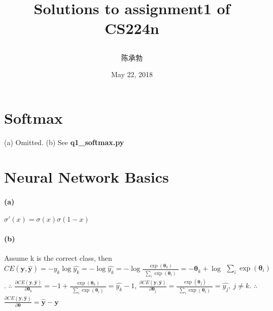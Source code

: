 \documentclass{article}
\title{
	\begin{LARGE}
		\textbf{Solutions to assignment1 of CS224n}
	\end{LARGE}
	}
\author{陈承勃}
\date{May 22, 2018}
\begin{document}
\begin{CJK}{UTF8}{gbsn}
\maketitle
\end{CJK}
\begin{spacing}{1.5} %

\section{Softmax}
(a) Omitted. 
(b) See \textbf{q1\_softmax.py}

\section{Neural Network Basics}
\paragraph{(a)} $ \sigma'(x)=\sigma(x)\sigma(1-x) $
\paragraph{(b)} 
Assume k is the correct class, then \newline
$ CE(\boldsymbol{y},\boldsymbol{\widehat{y}})=
-y_{k}\log \widehat{y_{k}}=-\log \widehat{y_{k}}
=-\log \frac{\exp(\boldsymbol{\theta}_k)}{\begin{matrix} \sum_{i} \exp(\boldsymbol{\theta}_i) \end{matrix}}
=-\boldsymbol{\theta}_{k}+\log \begin{matrix} \sum_{i} \exp(\boldsymbol{\theta}_{i}) \end{matrix} $.
\newline
$ \boldsymbol{\therefore} $
$ \frac{\partial CE(\boldsymbol{y},\boldsymbol{\widehat{y}})}{\partial \boldsymbol{\theta}_{k}}
=-1+\frac{\exp(\boldsymbol{\theta}_k)}{\begin{matrix} \sum_{i} \exp(\boldsymbol{\theta}_{i}) \end{matrix}}
=\widehat{y_{k}}-1 $, 
\newline
$ \frac{\partial CE(\boldsymbol{y},\boldsymbol{\widehat{y}})}{\partial \boldsymbol{\theta}_{j}}
=\frac{\exp(\boldsymbol{\theta}_j)}{\begin{matrix} \sum_{i} \exp(\boldsymbol{\theta}_{i}) \end{matrix}}
=\widehat{y_{j}},\ j\neq k $.
\newline
$ \boldsymbol{\therefore} $
$ \frac{\partial CE(\boldsymbol{y},\boldsymbol{\widehat{y}})}{\partial \boldsymbol{\theta}}=\boldsymbol{\widehat{y}}-\boldsymbol{y} $

\end{spacing}
\end{document}
